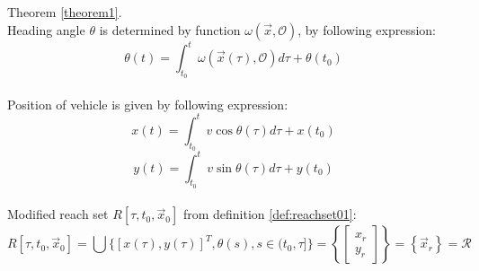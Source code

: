 \newpage
\begin{dokaz}{Theorem \ref{theorem1}.}
\\Heading angle $\theta$ is determined by function  $\omega(\vec{x},\mathscr{O})$, by following expression:
\begin{equation}
    \theta(t) = \int_{t_0}^{t} \omega(\vec{x}(\tau),\mathscr{O}) d\tau + \theta(t_0)
\end{equation}
\\Position of vehicle is given by following expression:
\begin{equation}
    x(t) = \int_{t_0}^{t} v\cos\theta(\tau) d\tau + x(t_0)
\end{equation}
\begin{equation}
    y(t) = \int_{t_0}^{t} v\sin\theta(\tau) d\tau + y(t_0)
\end{equation}
\\Modified reach set $R[\tau, t_0, \vec{x}_0]$ from definition \ref{def:reachset01}:
\begin{equation}\label{eq:theoremset1}
    R[\tau, t_0, \vec{x}_0] = \bigcup \{[{x}(\tau),y(\tau)]^T,\theta(s),s \in (t_0,\tau]\}=
    \left \{
    \begin{bmatrix}
    x_r\\
    y_r
    \end{bmatrix}
    \right\}
    = \left \{ \vec{x}_r \right\}
    = \mathscr{R}
\end{equation}


\end{dokaz}
